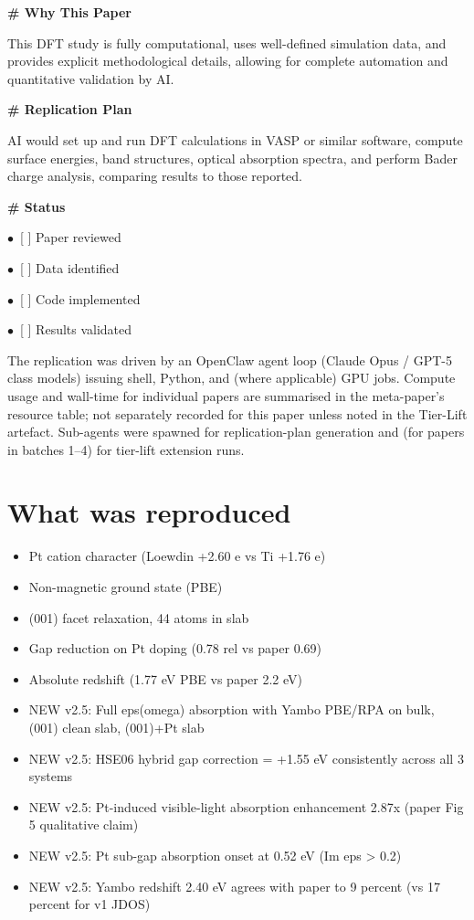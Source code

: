 \documentclass[11pt]{article}
\begin{document}
\par\medskip\textbf{\# Why This Paper}\par
This DFT study is fully computational, uses well-defined simulation data, and provides explicit methodological details, allowing for complete automation and quantitative validation by AI.

\par\medskip\textbf{\# Replication Plan}\par
AI would set up and run DFT calculations in VASP or similar software, compute surface energies, band structures, optical absorption spectra, and perform Bader charge analysis, comparing results to those reported.

\par\medskip\textbf{\# Status}\par
\par$\bullet$\ [ ] Paper reviewed
\par$\bullet$\ [ ] Data identified
\par$\bullet$\ [ ] Code implemented
\par$\bullet$\ [ ] Results validated
\normalsize

The replication was driven by an OpenClaw agent loop (Claude Opus / GPT-5 class models) issuing shell, Python, and (where applicable) GPU jobs. Compute usage and wall-time for individual papers are summarised in the meta-paper's resource table; not separately recorded for this paper unless noted in the Tier-Lift artefact. Sub-agents were spawned for replication-plan generation and (for papers in batches 1--4) for tier-lift extension runs.

\section{What was reproduced}
\begin{itemize}
\item Pt cation character (Loewdin +2.60 e vs Ti +1.76 e)
\item Non-magnetic ground state (PBE)
\item (001) facet relaxation, 44 atoms in slab
\item Gap reduction on Pt doping (0.78 rel vs paper 0.69)
\item Absolute redshift (1.77 eV PBE vs paper 2.2 eV)
\item NEW v2.5: Full eps(omega) absorption with Yambo PBE/RPA on bulk, (001) clean slab, (001)+Pt slab
\item NEW v2.5: HSE06 hybrid gap correction = +1.55 eV consistently across all 3 systems
\item NEW v2.5: Pt-induced visible-light absorption enhancement 2.87x (paper Fig 5 qualitative claim)
\item NEW v2.5: Pt sub-gap absorption onset at 0.52 eV (Im eps \textgreater{} 0.2)
\item NEW v2.5: Yambo redshift 2.40 eV agrees with paper to 9 percent (vs 17 percent for v1 JDOS)
\end{itemize}
\end{document}
